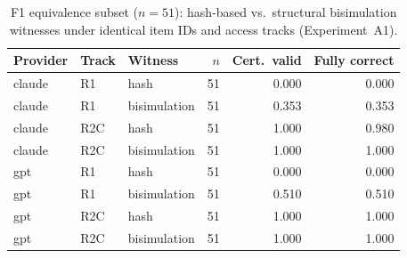 \begin{table}[t]
  \centering
  \caption{F1 equivalence subset ($n{=}51$): hash-based vs.\ structural bisimulation witnesses under identical item IDs and access tracks (Experiment~A1).}
  \label{tab:extension-constructible-equivalence}
  \begin{tabular}{@{}lllrrr@{}}
    \toprule
    Provider & Track & Witness & $n$ & Cert.\ valid & Fully correct \\
    \midrule
    claude & R1 & hash & 51 & 0.000 & 0.000 \\
    claude & R1 & bisimulation & 51 & 0.353 & 0.353 \\
    claude & R2C & hash & 51 & 1.000 & 0.980 \\
    claude & R2C & bisimulation & 51 & 1.000 & 1.000 \\
    gpt & R1 & hash & 51 & 0.000 & 0.000 \\
    gpt & R1 & bisimulation & 51 & 0.510 & 0.510 \\
    gpt & R2C & hash & 51 & 1.000 & 1.000 \\
    gpt & R2C & bisimulation & 51 & 1.000 & 1.000 \\
    \bottomrule
  \end{tabular}
\end{table}
